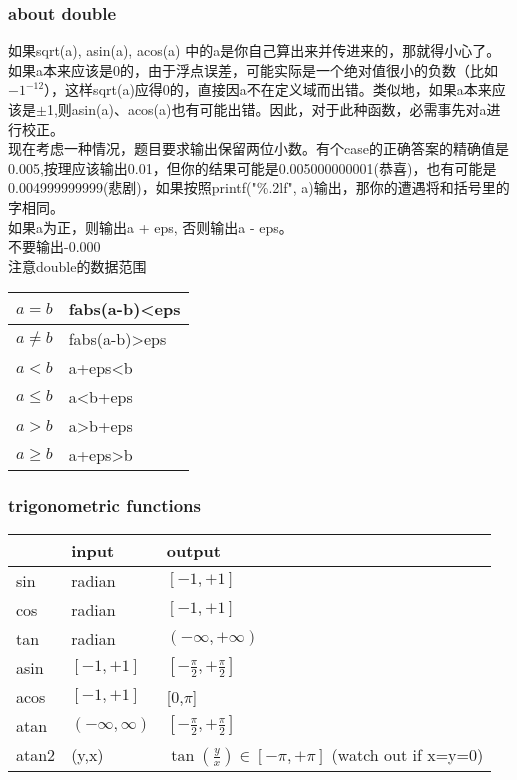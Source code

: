 \subsubsection{about double}

如果sqrt(a), asin(a), acos(a) 中的a是你自己算出来并传进来的，那就得小心了。如果a本来应该是0的，由于浮点误差，可能实际是一个绝对值很小的负数（比如$-1^{-12}$），这样sqrt(a)应得0的，直接因a不在定义域而出错。类似地，如果a本来应该是$\pm$1,则asin(a)、acos(a)也有可能出错。因此，对于此种函数，必需事先对a进行校正。\\

现在考虑一种情况，题目要求输出保留两位小数。有个case的正确答案的精确值是0.005,按理应该输出0.01，但你的结果可能是0.005000000001(恭喜)，也有可能是0.004999999999(悲剧)，如果按照printf("\%.2lf", a)输出，那你的遭遇将和括号里的字相同。\\
如果a为正，则输出a + eps, 否则输出a - eps。\\

不要输出-0.000\\

注意double的数据范围\\

\begin{tabular}{|l|l|}
\hline
$a=b$ & fabs(a-b)<eps\\
\hline
$a\neq b$ & fabs(a-b)>eps\\
\hline
$a<b$ &  a+eps<b\\
\hline
$a\leq b$ & a<b+eps\\
\hline
$a>b$  & a>b+eps\\
\hline
$a\geq b$ & a+eps>b\\
\hline
\end{tabular}

\subsubsection{trigonometric functions}

\begin{tabular}{|l|l|l|}
\hline
& input & output\\
\hline
sin & radian & $[-1,+1]$\\
\hline
cos & radian & $[-1,+1]$\\
\hline
tan & radian & $(-\infty,+\infty)$\\
\hline
asin & $[-1,+1]$ & $[-\frac{\pi}{2},+\frac{\pi}{2}]$\\
\hline
acos & $[-1,+1]$ & [0,$\pi$]\\
\hline
atan & $(-\infty,\infty)$ & $[-\frac{\pi}{2},+\frac{\pi}{2}]$\\
\hline
atan2 & (y,x) & $\tan(\frac{y}{x}) \in [-\pi,+\pi]$ (watch out if x=y=0)\\
\hline
\end{tabular}

